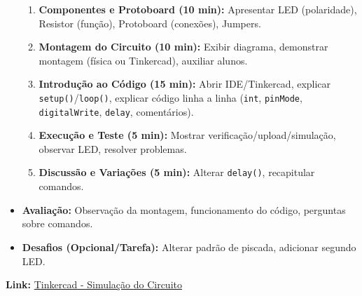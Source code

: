 \documentclass[a4paper,12pt]{article}
\begin{document}
\begin{itemize}
\begin{enumerate}
        \item \textbf{Componentes e Protoboard (10 min):} Apresentar LED (polaridade), Resistor (função), Protoboard (conexões), Jumpers.
        \item \textbf{Montagem do Circuito (10 min):} Exibir diagrama, demonstrar montagem (física ou Tinkercad), auxiliar alunos.
        \item \textbf{Introdução ao Código (15 min):} Abrir IDE/Tinkercad, explicar \texttt{setup()}/\texttt{loop()}, explicar código linha a linha (\texttt{int}, \texttt{pinMode}, \texttt{digitalWrite}, \texttt{delay}, comentários).
        \item \textbf{Execução e Teste (5 min):} Mostrar verificação/upload/simulação, observar LED, resolver problemas.
        \item \textbf{Discussão e Variações (5 min):} Alterar \texttt{delay()}, recapitular comandos.
    \end{enumerate}
    \item \textbf{Avaliação:} Observação da montagem, funcionamento do código, perguntas sobre comandos.
    \item \textbf{Desafios (Opcional/Tarefa):} Alterar padrão de piscada, adicionar segundo LED.
\end{itemize}

\vspace{0.5cm}
\noindent
\textbf{Link:} \href{https://www.tinkercad.com/things/78oGplaYCtD-pratica-1-piscar-led-ref-livro-proj-1-cap-2}{Tinkercad - Simulação do Circuito}
\end{document}
